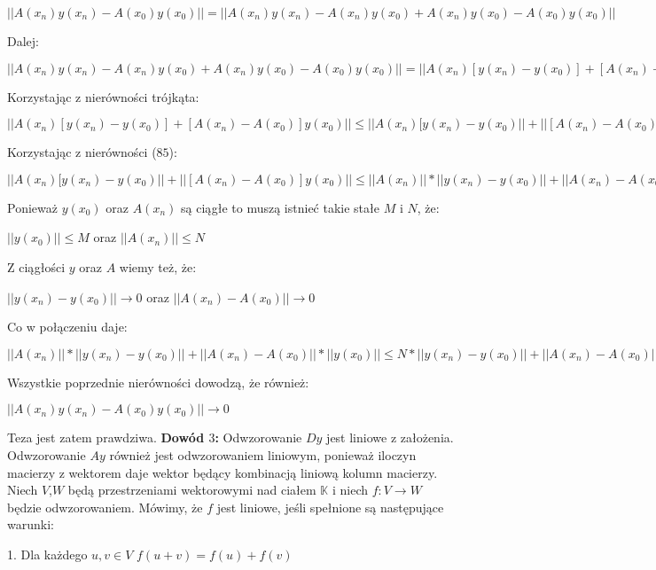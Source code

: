 \documentclass[12pt]{article}
\begin{document}
\begin{center}
\large $||A(x_n)y(x_n)-A(x_0)y(x_0)||=||A(x_n)y(x_n)-A(x_n)y(x_0)+A(x_n)y(x_0)-A(x_0)y(x_0)||$
\end{center}
Dalej:
\begin{center}
\large $||A(x_n)y(x_n)-A(x_n)y(x_0)+A(x_n)y(x_0)-A(x_0)y(x_0)||=||A(x_n)[y(x_n)-y(x_0)]+[A(x_n)-A(x_0)]y(x_0)||$
\end{center}
Korzystając z nierówności trójkąta:
\begin{center}
\large $||A(x_n)[y(x_n)-y(x_0)]+[A(x_n)-A(x_0)]y(x_0)||\leq||A(x_n)[y(x_n)-y(x_0)||+||[A(x_n)-A(x_0)]y(x_0)||$
\end{center}
Korzystając z nierówności ($85$):
\begin{center}
\large $||A(x_n)[y(x_n)-y(x_0)||+||[A(x_n)-A(x_0)]y(x_0)||\leq||A(x_n)||*||y(x_n)-y(x_0)||+||A(x_n)-A(x_0)||*||y(x_0)||$
\end{center}
Ponieważ $y(x_0)$ oraz $A(x_n)$ są ciągłe to muszą istnieć takie stałe $M$ i $N$, że:
\begin{center}
\large $||y(x_0)||\leq{M}$ oraz $||A(x_n)||\leq{N}$
\end{center}
Z ciągłości $y$ oraz $A$ wiemy też, że:
\begin{center}
\large $||y(x_n)-y(x_0)||\to{0}$ oraz $||A(x_n)-A(x_0)||\to{0}$
\end{center}
Co w połączeniu daje:
\begin{center}
\large $||A(x_n)||*||y(x_n)-y(x_0)||+||A(x_n)-A(x_0)||*||y(x_0)||\leq{N}*||y(x_n)-y(x_0)||+||A(x_n)-A(x_0)||*M\to{0}$
\end{center}
Wszystkie poprzednie nierówności dowodzą, że również:
\begin{center}
\large $||A(x_n)y(x_n)-A(x_0)y(x_0)||\to{0}$
\end{center}
Teza jest zatem prawdziwa. \newpage
\textbf{Dowód $3$:} \newline
Odwzorowanie $Dy$ jest liniowe z założenia. Odwzorowanie $Ay$ również jest odwzorowaniem liniowym, ponieważ iloczyn macierzy z wektorem daje wektor będący kombinacją liniową kolumn macierzy. \newline \newline
Niech $V$,$W$ będą przestrzeniami wektorowymi nad ciałem $\mathbb{K}$ i niech $f:V\to{W}$ będzie odwzorowaniem. Mówimy, że $f$ jest liniowe, jeśli spełnione są następujące warunki:
\begin{center}
\large 1. Dla każdego $u,v\in{V}$  $f(u+v)=f(u)+f(v)$ 
\end{center}
\end{document}
